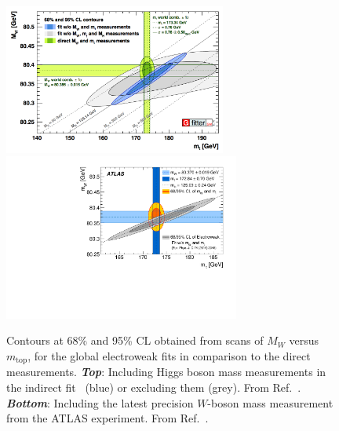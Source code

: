\begin{figure}[!htb]
    \begin{center}
        \includegraphics[width=0.65\textwidth]{figures/chapter1/sm_final/mw_vs_mt_indirect}
        \includegraphics[width=0.69\textwidth]{figures/chapter1/sm_final/atlas_w_boson_mass_mw_mt}
        \caption{
            Contours at 68\% and 95\% CL obtained from scans of $M_W$ versus $m_{\text{top}}$,
            for the global electroweak fits in comparison to the direct measurements.
            \textit{\textbf{Top}}: Including Higgs boson mass measurements in the indirect fit~\cite{HMassATLAS,HMassCMS} (blue)
                or excluding them (grey). From Ref.~\cite{GFitter}.
            \textit{\textbf{Bottom}}: Including the latest precision $W$-boson mass measurement from the ATLAS
                experiment. From Ref.~\cite{ATLASWMass}.
        }
        \label{fig:mw_mt_scan}
    \end{center}
\end{figure}

